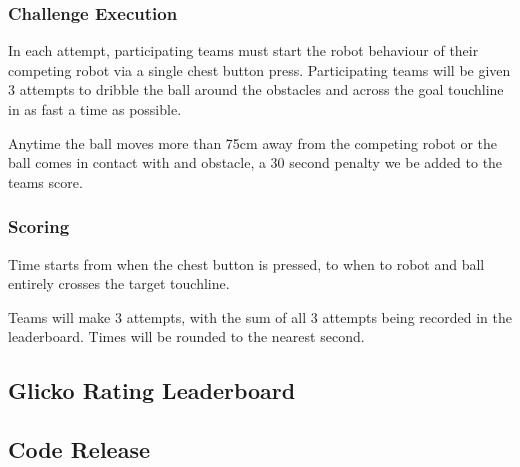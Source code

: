 \subsubsection{Challenge Execution}
In each attempt, participating teams must start the robot behaviour of their competing robot via a single chest button
press. Participating teams will be given 3 attempts to dribble the ball around the obstacles and across
the goal touchline in as fast a time as possible.

Anytime the ball moves more than 75cm away from the competing robot or the ball comes in contact with
and obstacle, a 30 second penalty we be added to the teams score.

\subsubsection{Scoring}
Time starts from when the chest button is pressed, to when to robot and ball entirely crosses the target touchline.

Teams will make 3 attempts, with the sum of all 3 attempts being recorded in the leaderboard.
Times will be rounded to the nearest second.

\subsection{Glicko Rating Leaderboard}


\subsection{Code Release}
